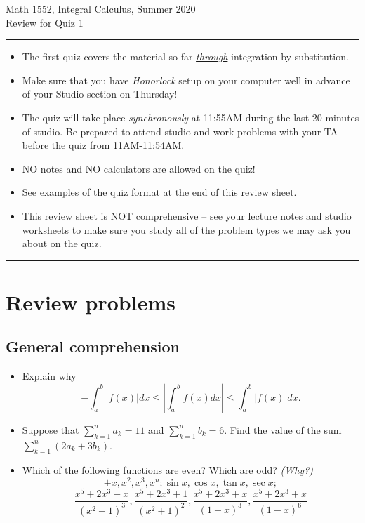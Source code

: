 \documentclass[12pt]{article}
\begin{document}
\vskip 1in
\begin{center}
     {\LARGE 
          Math 1552, Integral Calculus, Summer 2020 \\ 
          Review for Quiz 1
     }
\end{center}
\vskip 0.25in

\bigskip\hrule\bigskip

\begin{itemize}
     \item The first quiz covers the material so far \underline{\emph{through}} integration by substitution. 
     \item Make sure that you have \emph{Honorlock} setup on your computer well in advance of your 
           Studio section on Thursday! 
     \item The quiz will take place \emph{synchronously} at 11:55AM during the last 20 minutes of studio. 
           Be prepared to attend studio and work problems with your TA before the quiz from 11AM-11:54AM. 
     \item NO notes and NO calculators are allowed on the quiz!
     \item See examples of the quiz format at the end of this review sheet.
     \item This review sheet is NOT comprehensive -- see your lecture notes and studio worksheets to make 
           sure you study all of the problem types we may ask you about on the quiz.
\end{itemize}

\bigskip\hrule\bigskip

\newpage
\section{Review problems}

\subsection{General comprehension}

\begin{itemize}
     \item Explain why 
           \[
           - \int_a^b |f(x)| dx \leq \left\lvert \int_a^b f(x) dx \right\rvert \leq 
                \int_a^b |f(x)| dx. 
           \]
     \item Suppose that $\sum\limits_{k=1}^n a_k = 11$ and $\sum\limits_{k=1}^n b_k = 6$. 
           Find the value of the sum $\sum\limits_{k=1}^n \left(2a_k + 3b_k\right)$. 
     \item Which of the following functions are even? Which are odd? \emph{(Why?)} 
           \[
           \pm x, x^2, x^3, x^n; \sin x, \cos x, \tan x, \sec x; 
           \]
           \[
           \frac{x^5+2x^3+x}{(x^2+1)^3}, \frac{x^5+2x^3+1}{(x^2+1)^2}, 
           \frac{x^5+2x^3+x}{(1-x)^3}, \frac{x^5+2x^3+x}{(1-x)^6}
           \]
\end{itemize}
\end{document}
